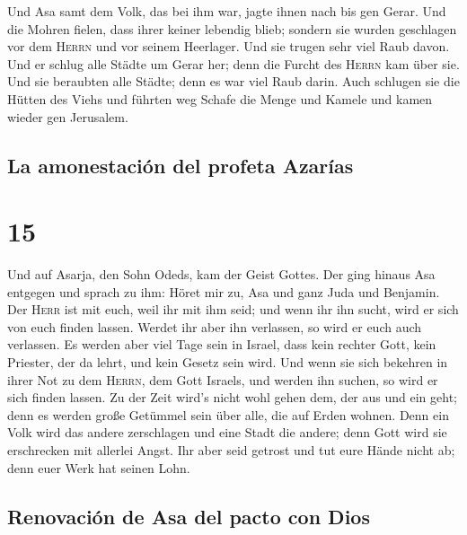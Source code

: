  Und Asa samt dem Volk, das bei ihm war, jagte ihnen nach
bis gen Gerar. Und die Mohren fielen, dass ihrer keiner lebendig blieb;
sondern sie wurden geschlagen vor dem \textsc{Herrn} und vor seinem
Heerlager. Und sie trugen sehr viel Raub davon.  Und er
schlug alle Städte um Gerar her; denn die Furcht des \textsc{Herrn} kam
über sie. Und sie beraubten alle Städte; denn es war viel Raub darin.
 Auch schlugen sie die Hütten des Viehs und führten weg
Schafe die Menge und Kamele und kamen wieder gen Jerusalem.

\hypertarget{la-amonestaciuxf3n-del-profeta-azaruxedas}{%
\subsection{La amonestación del profeta
Azarías}\label{la-amonestaciuxf3n-del-profeta-azaruxedas}}

\hypertarget{section-14}{%
\section{15}\label{section-14}}

 Und auf Asarja, den Sohn Odeds, kam der Geist Gottes.
 Der ging hinaus Asa entgegen und sprach zu ihm: Höret mir
zu, Asa und ganz Juda und Benjamin. Der \textsc{Herr} ist mit euch, weil
ihr mit ihm seid; und wenn ihr ihn sucht, wird er sich von euch finden
lassen. Werdet ihr aber ihn verlassen, so wird er euch auch verlassen.
 Es werden aber viel Tage sein in Israel, dass kein
rechter Gott, kein Priester, der da lehrt, und kein Gesetz sein wird.
 Und wenn sie sich bekehren in ihrer Not zu dem
\textsc{Herrn}, dem Gott Israels, und werden ihn suchen, so wird er sich
finden lassen.  Zu der Zeit wird's nicht wohl gehen dem,
der aus und ein geht; denn es werden große Getümmel sein über alle, die
auf Erden wohnen.  Denn ein Volk wird das andere
zerschlagen und eine Stadt die andere; denn Gott wird sie erschrecken
mit allerlei Angst.  Ihr aber seid getrost und tut eure
Hände nicht ab; denn euer Werk hat seinen Lohn.

\hypertarget{renovaciuxf3n-de-asa-del-pacto-con-dios}{%
\subsection{Renovación de Asa del pacto con
Dios}\label{renovaciuxf3n-de-asa-del-pacto-con-dios}}

